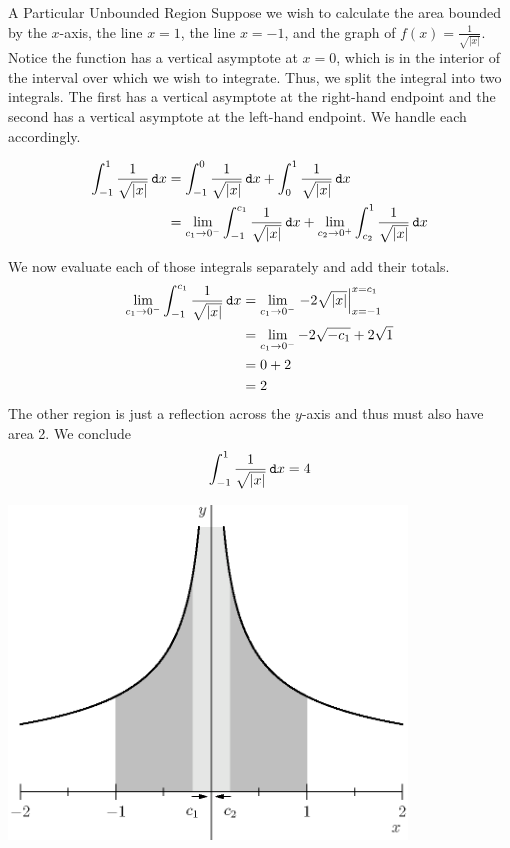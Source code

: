 \begin{example}{A Particular Unbounded Region }
Suppose we wish to calculate the area bounded by the $x$-axis, the line $x=1$, the line $x=-1$, and the graph of $f(x)=\frac{1}{\sqrt{|x|}}$.  Notice the function has a vertical asymptote at $x=0$, which is in the interior of the interval over which we wish to integrate.  Thus, we split the integral into two integrals.  The first has a vertical asymptote at the right-hand endpoint and the second has a vertical asymptote at the left-hand endpoint.  We handle each accordingly.

\begin{align*}
\int_{-1}^{1} \frac{1}{\sqrt{|x|}}\mathop{}\!\mathtt{d} x&=\int_{-1}^{0} \frac{1}{\sqrt{|x|}}\mathop{}\!\mathtt{d} x+\int_{0}^{1} \frac{1}{\sqrt{|x|}}\mathop{}\!\mathtt{d} x \\ 
&=\lim_{c_1 \rightarrow 0^-} \int_{-1}^{c_1} \frac{1}{\sqrt{|x|}} \mathop{}\!\mathtt{d} x + \lim_{c_2 \rightarrow 0^+} \int_{c_2}^1 \frac{1}{\sqrt{|x|}} \mathop{}\!\mathtt{d} x 
\end{align*} 

We now evaluate each of those integrals separately and add their totals.
\begin{align*}
\lim_{c_1 \rightarrow 0^-} \int_{-1}^{c_1} \frac{1}{\sqrt{|x|}} \mathop{}\!\mathtt{d} x &=\lim_{c_1 \rightarrow 0^-} \left. {-2\sqrt{|x|}}\right|_{x=-1}^{x=c_1} \\
&=\lim_{c_1 \rightarrow 0^-}  {-2\sqrt{-c_1}}+2\sqrt{1} \\
&=0+2 \\
&=2
\end{align*}
The other region is just a reflection across the $y$-axis and thus must also have area 2. We conclude $$ \int_{-1}^{1} \frac{1}{\sqrt{|x|}}\mathop{}\!\mathtt{d} x=4 $$

	\begin{center}       \includegraphics[width=300pt]{ChapterGeom/Figures/onesqrtx.eps}
    \end{center}
 \end{example}
 
